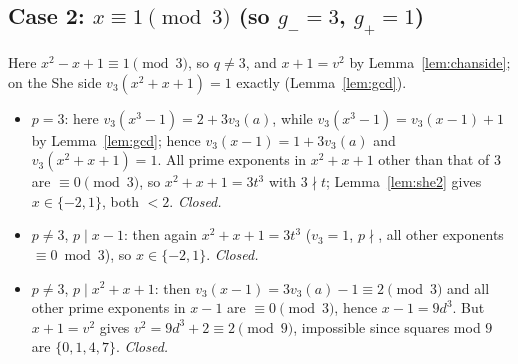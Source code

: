 \documentclass[11pt]{article}
\theoremstyle{remark}
\newcommand{\vp}{v}
\begin{document}
\subsection*{Case 2: $x\equiv1\pmod3$ (so $g_-=3$, $g_+=1$)}
Here $x^2-x+1\equiv1\pmod3$, so $q\neq3$, and $x+1=v^2$ by Lemma~\ref{lem:chanside}; on the She side $\vp_3(x^2+x+1)=1$ exactly (Lemma~\ref{lem:gcd}).
\begin{itemize}
\item $p=3$: here $\vp_3(x^3-1)=2+3\vp_3(a)$, while $\vp_3(x^3-1)=\vp_3(x-1)+1$ by Lemma~\ref{lem:gcd}; hence $\vp_3(x-1)=1+3\vp_3(a)$ and $\vp_3(x^2+x+1)=1$. All prime exponents in $x^2+x+1$ other than that of $3$ are $\equiv0\pmod3$, so $x^2+x+1=3t^3$ with $3\nmid t$; Lemma~\ref{lem:she2} gives $x\in\{-2,1\}$, both $<2$. \emph{Closed.}
\item $p\neq3$, $p\mid x-1$: then again $x^2+x+1=3t^3$ ($\vp_3=1$, $p\nmid$, all other exponents $\equiv0\bmod3$), so $x\in\{-2,1\}$. \emph{Closed.}
\item $p\neq3$, $p\mid x^2+x+1$: then $\vp_3(x-1)=3\vp_3(a)-1\equiv2\pmod3$ and all other prime exponents in $x-1$ are $\equiv0\pmod3$, hence $x-1=9d^3$. But $x+1=v^2$ gives $v^2=9d^3+2\equiv2\pmod 9$, impossible since squares mod $9$ are $\{0,1,4,7\}$. \emph{Closed.}
\end{itemize}
\end{document}
